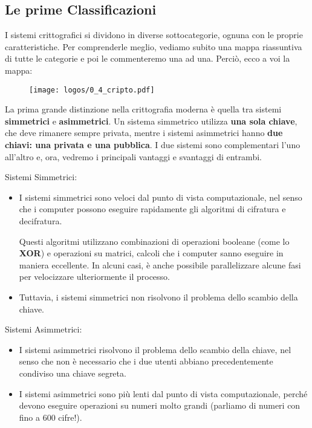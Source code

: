 \documentclass{report}
\begin{document}
\subsection{Le prime Classificazioni}

I sistemi crittografici si dividono in diverse sottocategorie, ognuna con le proprie caratteristiche. Per comprenderle meglio, vediamo subito una mappa riassuntiva di tutte le categorie e poi le commenteremo una ad una. Perciò, ecco a voi la mappa:

\begin{figure}[h]
    \centering
    \texttt{[image: logos/0\_4\_cripto.pdf]}
\end{figure}





La prima grande distinzione nella crittografia moderna è quella tra sistemi \textbf{simmetrici} e \textbf{asimmetrici}. Un sistema simmetrico utilizza \textbf{una sola chiave}, che deve rimanere sempre privata, mentre i sistemi asimmetrici hanno \textbf{due chiavi: una privata e una pubblica}. I due sistemi sono complementari l’uno all’altro e, ora, vedremo i principali vantaggi e svantaggi di entrambi.

Sistemi Simmetrici:

\begin{itemize}
    \item I sistemi simmetrici sono veloci dal punto di vista computazionale, nel senso che i computer possono eseguire rapidamente gli algoritmi di cifratura e decifratura. 
    
    Questi algoritmi utilizzano combinazioni di operazioni booleane (come lo \textbf{XOR}) e operazioni su matrici, calcoli che i computer sanno eseguire in maniera eccellente. In alcuni casi, è anche possibile parallelizzare alcune fasi per velocizzare ulteriormente il processo.
     
    \item Tuttavia, i sistemi simmetrici non risolvono il problema dello scambio della chiave.
\end{itemize}

Sistemi Asimmetrici:

\begin{itemize}
    \item I sistemi asimmetrici risolvono il problema dello scambio della chiave, nel senso che non è necessario che i due utenti abbiano precedentemente condiviso una chiave segreta.
    \item I sistemi asimmetrici sono più lenti dal punto di vista computazionale, perché devono eseguire operazioni su numeri molto grandi (parliamo di numeri con fino a 600 cifre!).
\end{itemize}
\end{document}
